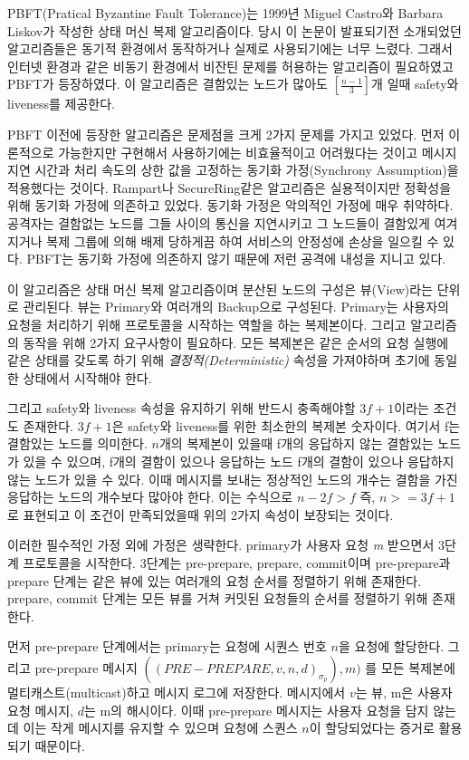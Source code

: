 PBFT(Pratical Byzantine Fault Tolerance)는
1999년 Miguel Castro와 Barbara Liskov가 작성한 상태 머신 복제 알고리즘이다.
당시 이 논문이 발표되기전 소개되었던 알고리즘들은 동기적 환경에서 동작하거나
실제로 사용되기에는 너무 느렸다. 그래서 인터넷 환경과 같은 비동기 환경에서
비잔틴 문제를 허용하는 알고리즘이 필요하였고 PBFT가 등장하였다. 이 알고리즘은
결함있는 노드가 많아도 \([\frac{n-1}{3}]\)개 일때 safety와 liveness를 제공한다.

PBFT 이전에 등장한 알고리즘은 문제점을 크게 2가지 문제를 가지고 있었다. 
먼저 이론적으로 가능한지만 구현해서 사용하기에는 비효율적이고 어려웠다는 것이고
메시지 지연 시간과 처리 속도의 상한 값을 고정하는 동기화 가정(Synchrony Assumption)을 적용했다는 것이다.
Rampart나 SecureRing같은 알고리즘은 실용적이지만 정확성을 위해 동기화 가정에 의존하고 있었다.
동기화 가정은 악의적인 가정에 매우 취약하다. 공격자는 결함없는 노드를 그들 사이의 통신을 지연시키고
그 노드들이 결함있게 여겨지거나 복제 그룹에 의해 배제 당하게끔 하여 서비스의 안정성에 손상을 일으킬 수 있다.
PBFT는 동기화 가정에 의존하지 않기 때문에 저런 공격에 내성을 지니고 있다.

이 알고리즘은 상태 머신 복제 알고리즘이며 분산된 노드의 구성은 뷰(View)라는 단위로 관리된다.
뷰는 Primary와 여러개의 Backup으로 구성된다.
Primary는 사용자의 요청을 처리하기 위해 프로토콜을 시작하는 역할을 하는 복제본이다.
그리고 알고리즘의 동작을 위해 2가지 요구사항이 필요하다.
모든 복제본은 같은 순서의 요청 실행에 같은 상태를 갖도록 하기 위해
\textit{결정적(Deterministic)} 속성을 가져야하며 초기에 동일한 상태에서 시작해야 한다.

그리고 safety와 liveness 속성을 유지하기 위해 반드시 충족해야할 \(3f+1\)이라는 조건도 존재한다.
\(3f+1\)은 safety와 liveness를 위한 최소한의 복제본 숫자이다. 여기서 f는 결함있는 노드를 의미한다.
\(n\)개의 복제본이 있을때 f개의 응답하지 않는 결함있는 노드가 있을 수 있으며, f개의 결함이 있으나 응답하는 노드
f개의 결함이 있으나 응답하지 않는 노드가 있을 수 있다. 이때 메시지를 보내는 정상적인 노드의 개수는 결함을 가진
응답하는 노드의 개수보다 많아야 한다. 이는 수식으로 \(n-2f > f\) 즉, \(n >= 3f+1\)로 표현되고
이 조건이 만족되었을때 위의 2가지 속성이 보장되는 것이다.

이러한 필수적인 가정 외에 가정은 생략한다. primary가 사용자 요청 \textit{m} 받으면서 3단계 프로토콜을 시작한다.
3단계는 pre-prepare, prepare, commit이며 pre-prepare과 prepare 단계는
같은 뷰에 있는 여러개의 요청 순서를 정렬하기 위해 존재한다.
prepare, commit 단계는 모든 뷰를 거쳐 커밋된 요청들의 순서를 정렬하기 위해 존재한다.

먼저 pre-prepare 단계에서는 primary는 요청에 시퀀스 번호 \(n\)을 요청에 할당한다.
그리고 pre-prepare 메시지 \(((PRE-PREPARE,v,n,d)_{\sigma_{p}}),m)\)
를 모든 복제본에 멀티캐스트(multicast)하고 메시지 로그에 저장한다. 메시지에서 \(v\)는 뷰, m은 사용자 요청 메시지,
\(d\)는 m의 해시이다. 이때 pre-prepare 메시지는 사용자 요청을 담지 않는데 이는 작게 메시지를 유지할 수 있으며
요청에 스퀀스 \(n\)이 할당되었다는 증거로 활용되기 때문이다.

